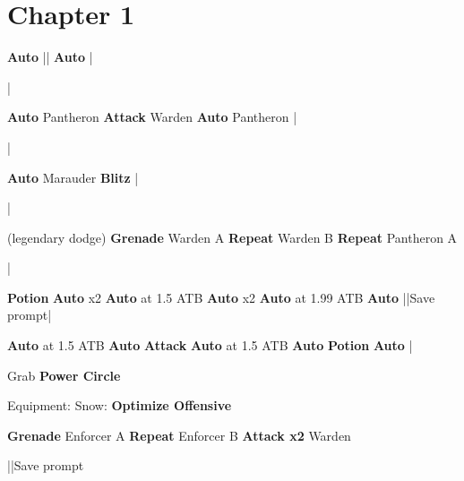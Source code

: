 \section{Chapter 1}

\begin{mainlist}
	\item {}
	\item {} \textbf{Auto} |\skip| \textbf{Auto}
		|\skip
	\item \skip|\skip
	\item {} \textbf{Auto} Pantheron \to
		\textbf{Attack} Warden \to \textbf{Auto} Pantheron |\skip
	\item \skip|\skip
	\item {} \textbf{Auto} Marauder \to \textbf{Blitz}
		|
	\item \skip|\skip
	\item {} (legendary dodge) \textbf{Grenade} Warden A \to
		\textbf{Repeat} Warden B \to \textbf{Repeat} Pantheron A
	\item \skip|\skip
	\item {} \textbf{Potion} \to \textbf{Auto} x2 \to
		\textbf{Auto} at 1.5 ATB \to \textbf{Auto} x2 \to
		\textbf{Auto} at 1.99 ATB \to \textbf{Auto} |\skip|Save prompt|\skip
	\item {} \textbf{Auto} at 1.5 ATB \to \textbf{Auto} \to
		\textbf{Attack} \to \textbf{Auto} at 1.5 ATB \to \textbf{Auto} \to
		\textbf{\textbf{Potion}} \to \textbf{Auto} |
	\item Grab \textbf{Power Circle}
\end{mainlist}
\begin{menu}
	\item Equipment: Snow: \textbf{Optimize Offensive}
\end{menu}
\begin{mainlist}
	\item \skip
	\item {} \textbf{Grenade} Enforcer A \to
		\textbf{Repeat} Enforcer B \to \textbf{Attack x2} Warden
	\item {}|\skip|Save prompt
\end{mainlist}
